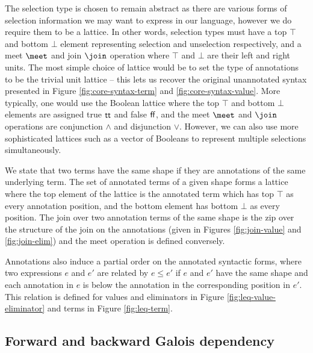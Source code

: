 
The selection type is chosen to remain abstract as there are various forms of selection information we may want to express in our language, however we do require them to be a lattice. In other words, selection types must have a top $\top$ and bottom $\bot$ element representing selection and unselection respectively, and a meet $\meet$ and join $\join$ operation where $\top$ and $\bot$ are their left and right units. The most simple choice of lattice would be to set the type of annotations to be the trivial unit lattice -- this lets us recover the original unannotated syntax presented in Figure \ref{fig:core-syntax-term} and \ref{fig:core-syntax-value}. More typically, one would use the Boolean lattice where the top $\top$ and bottom $\bot$ elements are assigned true $\mathsf{tt}$ and false $\mathsf{ff}$, and the meet $\meet$ and $\join$ operations are conjunction $\land$ and disjunction $\lor$. However, we can also use more sophisticated lattices such as a vector of Booleans to represent multiple selections simultaneously.

We state that two terms have the same shape if they are annotations of the same underlying term. The set of annotated terms of a given shape forms a lattice where the top element of the lattice is the annotated term which has top $\top$ as every annotation position, and the bottom element has bottom $\bot$ as every position. The join over two annotation terms of the same shape is the zip over the structure of the join on the annotations (given in Figures \ref{fig:join-value} and \ref{fig:join-elim}) and the meet operation is defined conversely.

Annotations also induce a partial order on the annotated syntactic forms, where two expressions $e$ and $e'$ are related by $e \leq e'$ if $e$ and $e'$ have the same shape and each annotation in $e$ is below the annotation in the corresponding position in $e'$.  This relation is defined for values and eliminators in Figure \ref{fig:leq-value-eliminator} and terms in Figure \ref{fig:leq-term}.

\subsection{Forward and backward Galois dependency}
\label{sec:core-language:fwd-bwd}

